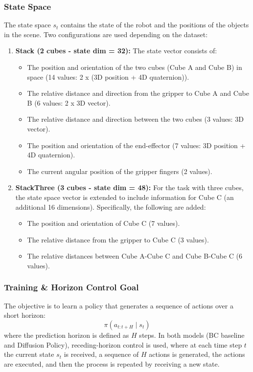 \documentclass[11pt,a4paper]{article}
\begin{document}
\subsubsection{State Space}
The state space $s_t$ contains the state of the robot and the positions of the objects in the scene. Two configurations are used depending on the dataset:
\begin{enumerate}
    \item \textbf{Stack (2 cubes - state dim = 32):}
    The state vector consists of:
    \begin{itemize}
        \item The position and orientation of the two cubes (Cube A and Cube B) in space (14 values: 2 x (3D position + 4D quaternion)).
        \item The relative distance and direction from the gripper to Cube A and Cube B (6 values: 2 x 3D vector).
        \item The relative distance and direction between the two cubes (3 values: 3D vector).
        \item The position and orientation of the end-effector (7 values: 3D position + 4D quaternion).
        \item The current angular position of the gripper fingers (2 values).
    \end{itemize}

    \item \textbf{StackThree (3 cubes - state dim = 48):}
    For the task with three cubes, the state space vector is extended to include information for Cube C (an additional 16 dimensions). Specifically, the following are added:
    \begin{itemize}
        \item The position and orientation of Cube C (7 values).
        \item The relative distance from the gripper to Cube C (3 values).
        \item The relative distances between Cube A-Cube C and Cube B-Cube C (6 values).
    \end{itemize}
\end{enumerate}

\subsubsection{Training \& Horizon Control Goal}
The objective is to learn a policy that generates a sequence of actions over a short horizon:
\[ \pi(a_{t:t+H} \mid s_t) \]
where the prediction horizon is defined as $H$ steps. In both models (BC baseline and Diffusion Policy), receding-horizon control is used, where at each time step $t$ the current state $s_t$ is received, a sequence of $H$ actions is generated, the actions are executed, and then the process is repeated by receiving a new state.
\end{document}
